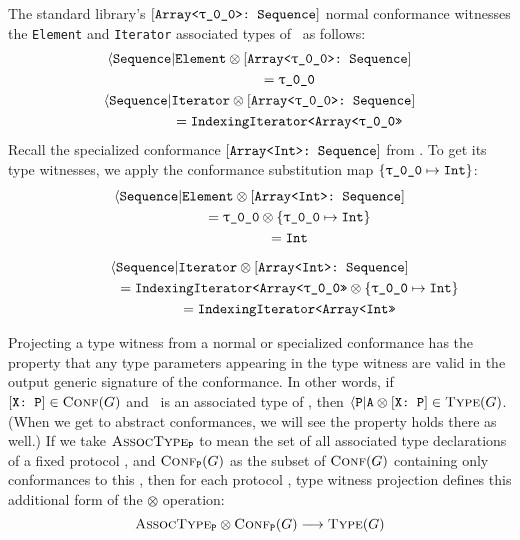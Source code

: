 \documentclass[../generics]{subfiles}
\begin{document}
\begin{example}\label{array type witness example}
The standard library's $\ArraySequence$ normal conformance witnesses the \texttt{Element} and \texttt{Iterator} associated types of \tSequence\ as follows:
\begin{gather*}
\AElement \otimes \ArraySequence \\
\qquad\qquad {}  = \rT\\
\AIterator \otimes \ArraySequence\\
\qquad\qquad {} = \texttt{IndexingIterator<Array<\rT>>}
\end{gather*}
Recall the specialized conformance $[\texttt{Array<Int>:~Sequence}]$ from . To get its type witnesses, we apply the conformance substitution map $\SubMapInt$:
\begin{gather*}
\AElement \otimes \ArrayIntSequence \\
\qquad\qquad {} = \rT \otimes \SubMapInt\\
\qquad\qquad {} = \texttt{Int}\\[\medskipamount]
\AIterator \otimes \ArrayIntSequence\\
\qquad\qquad {} = \texttt{IndexingIterator<Array<\rT>>}\otimes\SubMapInt\\
\qquad\qquad {} = \texttt{IndexingIterator<Array<Int>>}
\end{gather*}
\end{example}

Projecting a type witness from a normal or specialized conformance has the property that any type parameters appearing in the type witness are valid in the output generic signature of the conformance. In other words, if $[\texttt{X:~P}]\in\textsc{Conf}({G})$ and \nA\ is an associated type of \tP, then $\langle\texttt{P}|\texttt{A}\otimes[\texttt{X:~P}]\in\textsc{Type}({G})$. (When we get to abstract conformances, we will see the property holds there as well.) If we take $\textsc{AssocType}_{\texttt{P}}$ to mean the set of all associated type declarations of a fixed protocol \tP, and $\textsc{Conf}_{\texttt{P}}({G})$ as the subset of $\textsc{Conf}({G})$ containing only conformances to this \tP, then for each protocol \tP, type witness projection defines this additional form of the \index{$\otimes$}$\otimes$ operation:
\[\textsc{AssocType}_{\texttt{P}}\otimes\textsc{Conf}_{\texttt{P}}({G})\longrightarrow\textsc{Type}({G})\]
\end{document}
